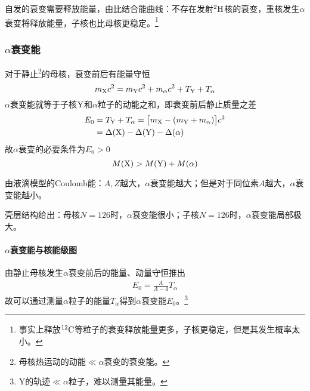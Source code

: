 自发的衰变需要释放能量，由比结合能曲线：不存在发射${^{2}\mathrm{H}}$核的衰变，重核发生$\alpha$衰变将释放能量，子核也比母核更稳定。\footnote{事实上释放${^{12}\mathrm{C}}$等粒子的衰变释放能量更多，子核更稳定，但是其发生概率太小。}

\subsubsection[\textit{\textalpha}衰变能]{$\alpha$衰变能}
对于静止\footnote{母核热运动的动能$\ll\alpha$衰变的衰变能。}的母核，衰变前后有能量守恒
\[
	m_{\mathrm{X}}c^2=m_{\mathrm{Y}}c^2+m_\alpha c^2+T_{\mathrm{Y}}+T_\alpha
\]
$\alpha$衰变能就等于子核$\mathrm{Y}$和$\alpha$粒子的动能之和，即衰变前后静止质量之差
\begin{align}
	E_0&=T_{\mathrm{Y}}+T_\alpha=\bigl[m_{\mathrm{X}}-(m_{\mathrm{Y}}+m_\alpha)\bigr]c^2\\\notag
	&=\Delta(\mathrm{X})-\Delta(\mathrm{Y})-\Delta(\alpha)
\end{align}
故$\alpha$衰变的必要条件为$E_0>0$
\[
	M(\mathrm{X})>M(\mathrm{Y})+M(\alpha)
\]

由液滴模型的Coulomb能：$A,Z$越大，$\alpha$衰变能越大；但是对于同位素$A$越大，$\alpha$衰变能越小。

壳层结构给出：母核$N=126$时，$\alpha$衰变能很小；子核$N=126$时，$\alpha$衰变能局部极大。

\paragraph{$\alpha$衰变能与核能级图}
由静止母核发生$\alpha$衰变前后的能量、动量守恒推出
\begin{align}
	E_0=\frac{A}{A-4}T_\alpha
\end{align}
故可以通过测量$\alpha$粒子的能量$T_\alpha$得到$\alpha$衰变能$E_0$。\footnote{Y的轨迹$\ll\alpha$粒子，难以测量其能量。}

